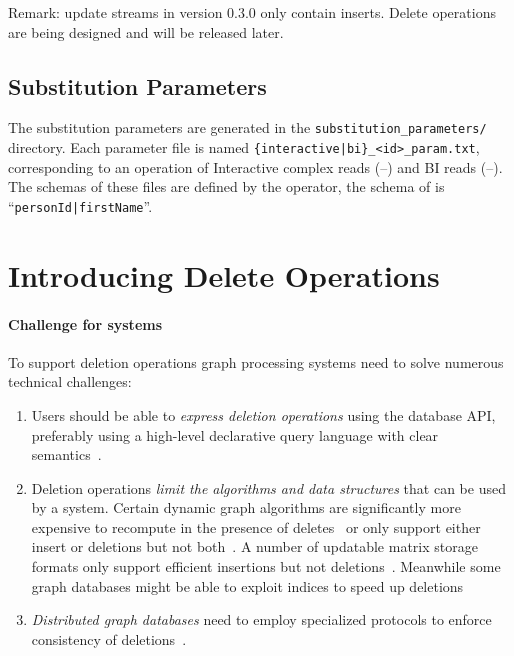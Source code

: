 Remark: update streams in version 0.3.0 only contain inserts. Delete operations are being designed and will be released later.

\subsection{Substitution Parameters}

The substitution parameters are generated in the \texttt{substitution\_parameters/} directory.
Each parameter file is named \texttt{\{interactive|bi\}\_<id>\_param.txt}, corresponding to an operation of
Interactive complex reads (--) and
BI reads (--).
The schemas of these files are defined by the operator, \eg the schema of  is ``\texttt{personId|firstName}''.


\section{Introducing Delete Operations}

\paragraph{Challenge for systems}
To support deletion operations graph processing systems need to solve numerous technical challenges:
%
\begin{enumerate}
\item Users should be able to \emph{express deletion operations} using the database API, preferably using a high-level declarative query language with clear semantics~\cite{Green2019}.
\item Deletion operations \emph{limit the algorithms and data structures} that can be used by a system. Certain dynamic graph algorithms are significantly more expensive to recompute in the presence of deletes~\cite{DBLP:conf/soda/Roditty13} or only support either insert or deletions but not both~\cite{DBLP:conf/esa/RodittyZ04}. A number of updatable matrix storage formats only support efficient insertions but not deletions~\cite{DBLP:conf/hpec/BusatoGBB18}. Meanwhile some graph databases might be able to exploit indices to speed up deletions~\cite[Sec.~4.4.2]{Besta2019}
\item \emph{Distributed graph databases} need to employ specialized protocols to enforce consistency of deletions~\cite{Waudby2020}.
\end{enumerate}

